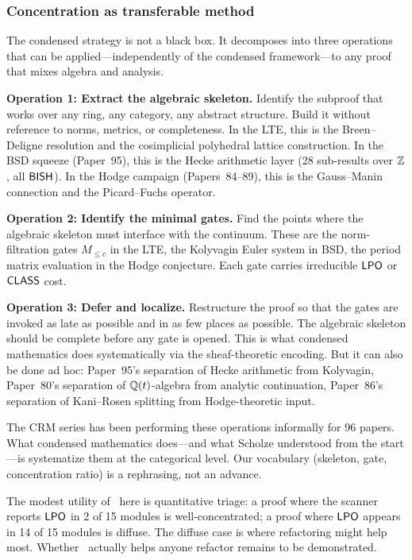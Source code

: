 \subsubsection{Concentration as transferable method}\label{sec:transferable}

The condensed strategy is not a black box.  It decomposes into three
operations that can be applied---independently of the condensed
framework---to any proof that mixes algebra and analysis.

\medskip
\noindent\textbf{Operation 1: Extract the algebraic skeleton.}
Identify the subproof that works over any ring, any category, any
abstract structure.  Build it without reference to norms, metrics,
or completeness.  In the LTE, this is the Breen--Deligne resolution
and the cosimplicial polyhedral lattice construction.  In the BSD
squeeze (Paper~95), this is the Hecke arithmetic layer (28
sub-results over $\mathbb{Z}$, all $\textsf{BISH}$).  In the Hodge campaign
(Papers~84--89), this is the Gauss--Manin connection and the
Picard--Fuchs operator.

\medskip
\noindent\textbf{Operation 2: Identify the minimal gates.}
Find the points where the algebraic skeleton must interface with
the continuum.  These are the norm-filtration gates $M_{\leq c}$
in the LTE, the Kolyvagin Euler system in BSD, the period matrix
evaluation in the Hodge conjecture.  Each gate carries irreducible
$\textsf{LPO}$ or $\textsf{CLASS}$ cost.

\medskip
\noindent\textbf{Operation 3: Defer and localize.}
Restructure the proof so that the gates are invoked as late as
possible and in as few places as possible.  The algebraic skeleton
should be complete before any gate is opened.  This is what
condensed mathematics does systematically via the sheaf-theoretic
encoding.  But it can also be done ad hoc: Paper~95's separation
of Hecke arithmetic from Kolyvagin, Paper~80's separation of
$\mathbb{Q}(t)$-algebra from analytic continuation, Paper~86's separation
of Kani--Rosen splitting from Hodge-theoretic input.

\medskip

The CRM series has been performing these operations informally
for 96 papers.  What condensed mathematics does---and what Scholze
understood from the start---is systematize them at the categorical
level.  Our vocabulary (skeleton, gate, concentration ratio) is a
rephrasing, not an advance.

The modest utility of \CRMlint\ here is quantitative triage:
a proof where the scanner reports $\textsf{LPO}$ in 2 of 15 modules is
well-concentrated; a proof where $\textsf{LPO}$ appears in 14 of 15
modules is diffuse.  The diffuse case is where refactoring might
help most.  Whether \CRMlint\ actually helps anyone refactor
remains to be demonstrated.


